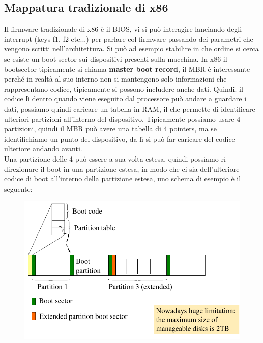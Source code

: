\documentclass[12pt, oneside]{extbook}
\begin{document}
\subsection{Mappatura tradizionale di x86}
Il firmware tradizionale di x86 è il BIOS, vi si può interagire lanciando degli interrupt (keys f1, f2 etc...) per parlare col firmware passando dei parametri che vengono scritti nell'architettura. Si può ad esempio stabilire in che ordine si cerca se esiste un boot sector sui dispositivi presenti sulla macchina. In x86 il bootsector tipicamente si chiama \textbf{master boot record}, il MBR è interessante perché in realtà al suo interno non si mantengono solo informazioni che rappresentano codice, tipicamente si possono includere anche dati. Quindi. il codice lì dentro quando viene eseguito dal processore può andare a guardare i dati, possiamo quindi caricare un tabella in RAM, il che permette di identificare ulteriori partizioni all'interno del dispositivo. Tipicamente possiamo usare 4 partizioni, quindi il MBR può avere una tabella di 4 pointers, ma se identifichiamo un punto del dispositivo, da lì si può far caricare del codice ulteriore andando avanti.\\ Una partizione delle 4 può essere a sua volta estesa, quindi possiamo ri-direzionare il boot in una partizione estesa, in modo che ci sia dell'ulteriore codice di boot all'interno della partizione estesa, uno schema di esempio è il seguente:
\begin{figure}[!h]
	\includegraphics[scale=0.4]{immagini/bios_boot_overview.png}
\end{figure}
\end{document}

